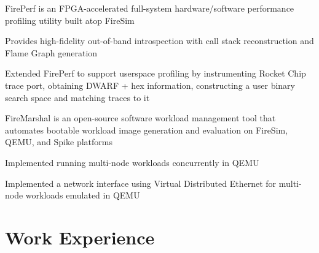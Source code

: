 \documentclass[]{deedy-resume-openfont}
\begin{document}


\begin{tightemize}
{\normalsize
\item FirePerf is an FPGA-accelerated full-system hardware/software performance profiling utility built atop FireSim
\item Provides high-fidelity out-of-band introspection with call stack reconstruction and Flame Graph generation
\item Extended FirePerf to support userspace profiling by instrumenting Rocket Chip trace port, obtaining DWARF + hex information, constructing a user binary search space and matching traces to it
}
\end{tightemize}

\begin{tightemize}
{\normalsize
\item FireMarshal is an open-source software workload management tool that automates bootable workload image generation and evaluation on FireSim, QEMU, and Spike platforms
\item Implemented running multi-node workloads concurrently in QEMU
\item Implemented a network interface using Virtual Distributed Ethernet for multi-node workloads emulated in QEMU
}
\end{tightemize}


\sectionsep

\section{Work Experience}
\end{document}

